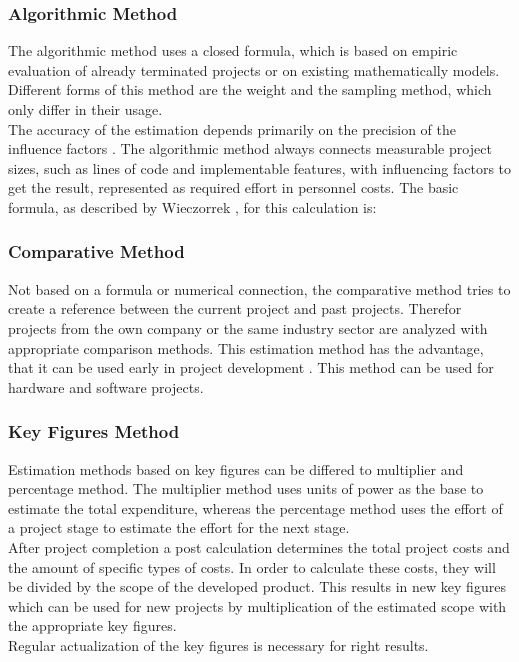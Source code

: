 \subsubsection{Algorithmic Method}

The algorithmic method uses a closed formula, which is based on empiric evaluation of already terminated projects or on existing mathematically models. Different forms of this method are the weight and the sampling method, which only differ in their usage.\\
The accuracy of the estimation depends primarily on the precision of the influence factors \cite{itplanung}. The algorithmic method always connects measurable project sizes, such as lines of code and implementable features, with influencing factors to get the result, represented as required effort in personnel costs. The basic formula, as described by Wieczorrek \cite{itplanung}, for this calculation is:\\

\subsubsection{Comparative Method}

Not based on a formula or numerical connection, the comparative method tries to create a reference between the current project and past projects. Therefor projects from the own company or the same industry sector are analyzed with appropriate comparison methods. This estimation method has the advantage, that it can be used early in project development \cite{itplanung}. This method can be used for hardware and software projects.

\subsubsection{Key Figures Method}

Estimation methods based on key figures can be differed to multiplier and percentage  method. The multiplier method uses units of power as the base to estimate the total expenditure, whereas the percentage method uses the effort of a project stage to estimate the effort for the next stage.\\
After project completion a post calculation determines the total project costs and the amount of specific types of costs. In order to calculate these costs, they will be divided by the scope of the developed product. This results in new key figures which can be used for new projects by multiplication of the estimated scope with the appropriate key figures.\\
\cite{itplanung} Regular actualization of the key figures is necessary for right results.\\

